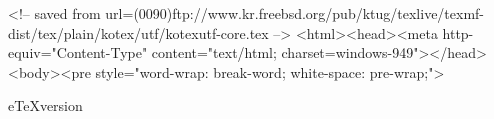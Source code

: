
<!-- saved from url=(0090)ftp://www.kr.freebsd.org/pub/ktug/texlive/texmf-dist/tex/plain/kotex/utf/kotexutf-core.tex -->
<html><head><meta http-equiv="Content-Type" content="text/html; charset=windows-949"></head><body><pre style="word-wrap: break-word; white-space: pre-wrap;">%

\expandafter\ifx\csname eTeXversion\endcsname\relax
  \expandafter\endinput
\fi

\frenchspacing

\def\UTFviii@two@octets#1#2{%
  \ifx\protect\noexpand
    \string#1\string#2%
  \else
    \ifcsname u8:\string#1\string#2\endcsname
      \expandafter\expandafter\expandafter\csname
        u8:\string#1\string#2%
      \expandafter\expandafter\expandafter\endcsname
    \else
      \expandafter\expandafter\expandafter\unihangul@two@octets
      \expandafter\expandafter\expandafter#1%
      \expandafter\expandafter\expandafter#2%
    \fi
  \fi
}
\def\unihangul@two@octets#1#2{%
    \expandafter\unihangulchar\expandafter{%
      \number\numexpr
	(`#1 - 192) * 64 +
	(`#2 - 128) \relax}}
\def\UTFviii@three@octets#1#2#3{%
  \ifx\protect\noexpand
    \string#1\string#2\string#3%
  \else
    \ifcsname u8:\string#1\string#2\string#3\endcsname
      \expandafter\expandafter\expandafter\csname
        u8:\string#1\string#2\string#3%
      \expandafter\expandafter\expandafter\endcsname
    \else
      \expandafter\expandafter\expandafter\unihangul@three@octets
      \expandafter\expandafter\expandafter#1%
      \expandafter\expandafter\expandafter#2%
      \expandafter\expandafter\expandafter#3%
    \fi
  \fi 
}
\def\unihangul@three@octets#1#2#3{%
    \expandafter\unihangulchar\expandafter{%
      \number\numexpr
	(`#1 - 224) * 4096 +
	(`#2 - 128) * 64 +
	(`#3 - 128) \relax}}
\def\UTFviii@four@octets#1#2#3#4{%
  \ifx\protect\noexpand
    \string#1\string#2\string#3\string#4%
  \else
    \ifcsname u8:\string#1\string#2\string#3\string#4\endcsname
      \expandafter\expandafter\expandafter\csname
        u8:\string#1\string#2\string#3\string#4%
      \expandafter\expandafter\expandafter\endcsname
    \else
      \expandafter\expandafter\expandafter\unihangul@four@octets
      \expandafter\expandafter\expandafter#1%
      \expandafter\expandafter\expandafter#2%
      \expandafter\expandafter\expandafter#3%
      \expandafter\expandafter\expandafter#4%
    \fi
  \fi
}
\def\unihangul@four@octets#1#2#3#4{%
    \expandafter\unihangulchar\expandafter{%
      \number\numexpr
	(`#1 - 240) * 262144 +
	(`#2 - 128) * 4096 +
	(`#3 - 128) * 64 +
	(`#4 - 128) \relax}}


